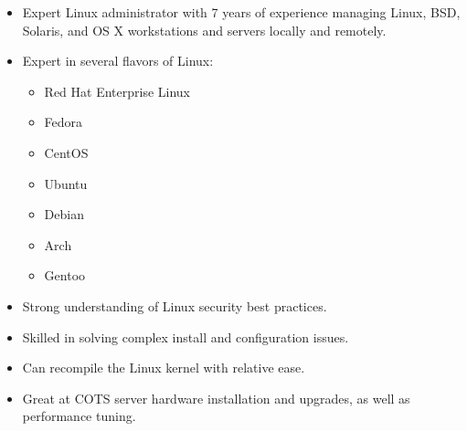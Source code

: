 \documentclass[a4paper,12pt]{memoir} %
\begin{document}
\userinformation %

\framebreak %






\begin{itemize}
	\item Expert Linux administrator with 7 years of experience managing Linux, BSD, Solaris, and OS X workstations and servers locally and remotely.
	\item Expert in several flavors of Linux:
		\begin{itemize}
			\item Red Hat Enterprise Linux
			\item Fedora
			\item CentOS
			\item Ubuntu
			\item Debian
			\item Arch
			\item Gentoo
		\end{itemize}
	\item Strong understanding of Linux security best practices.
	\item Skilled in solving complex install and configuration issues.
	\item Can recompile the Linux kernel with relative ease.
	\item Great at COTS server hardware installation and upgrades, as well as performance tuning.
\end{itemize}
\Sep
\end{document}
